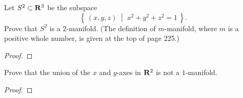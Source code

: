 \newpage
\begin{problem}[(C)]
Let $S^2\subset\mathbf{R}^3$ be the subspace
\[
\left\{\,(x,y,z)\;\middle|\; x^2+y^2+z^2=1\,\right\}.
\]
Prove that $S^2$ is a $2$-manifold. (The definition of
$m$-manifold, where $m$ is a positive whole number, is given at
the top of page 225.)
\end{problem}
\begin{proof}
\end{proof}
\newpage
\begin{problem}[(D)]
Prove that the union of the $x$ and $y$-axes in $\mathbf{R}^2$ is not a
$1$-manifold.
\end{problem}
\begin{proof}
\end{proof}

